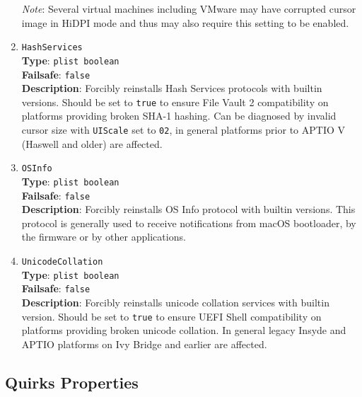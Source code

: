 \documentclass[]{article}
\begin{document}
\begin{enumerate}
  \emph{Note}: Several virtual machines including VMware may have corrupted
  cursor image in HiDPI mode and thus may also require this setting to be enabled.

\item
  \texttt{HashServices}\\
  \textbf{Type}: \texttt{plist\ boolean}\\
  \textbf{Failsafe}: \texttt{false}\\
  \textbf{Description}: Forcibly reinstalls Hash Services protocols with builtin
  versions. Should be set to \texttt{true} to ensure File Vault 2 compatibility
  on platforms providing broken SHA-1 hashing. Can be diagnosed by invalid
  cursor size with \texttt{UIScale} set to \texttt{02}, in general platforms
  prior to APTIO V (Haswell and older) are affected.

\item
  \texttt{OSInfo}\\
  \textbf{Type}: \texttt{plist\ boolean}\\
  \textbf{Failsafe}: \texttt{false}\\
  \textbf{Description}: Forcibly reinstalls OS Info protocol with builtin
  versions. This protocol is generally used to receive notifications from macOS
  bootloader, by the firmware or by other applications.

\item
  \texttt{UnicodeCollation}\\
  \textbf{Type}: \texttt{plist\ boolean}\\
  \textbf{Failsafe}: \texttt{false}\\
  \textbf{Description}: Forcibly reinstalls unicode collation services with builtin
  version. Should be set to \texttt{true} to ensure UEFI Shell compatibility
  on platforms providing broken unicode collation. In general legacy Insyde and APTIO
  platforms on Ivy Bridge and earlier are affected.

\end{enumerate}

\subsection{Quirks Properties}\label{uefiquirkprops}
\end{document}
